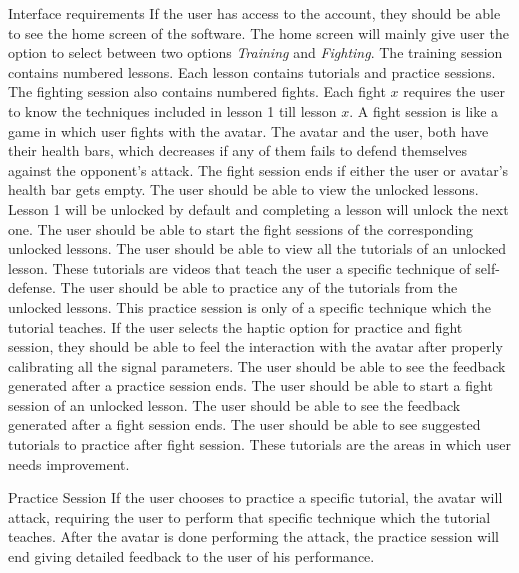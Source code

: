 \begin{outline}
 \1 Interface requirements
  \2 If the user has access to the account, they should be able to see the home screen of the software. The home screen will mainly give user the option to select between two options \textit{Training} and \textit{Fighting}.
  \2 The training session contains numbered lessons. Each lesson contains tutorials and practice sessions. 
  \2 The fighting session also contains numbered fights. Each fight $x$ requires the user to know the techniques included in lesson 1 till lesson $x$. A fight session is like a game in which user fights with the avatar. The avatar and the user, both have their health bars, which decreases if any of them fails to defend themselves against the opponent's attack. The fight session ends if either the user or avatar’s health bar gets empty. 
  \2 The user should be able to view the unlocked lessons. Lesson 1 will be unlocked by default and completing a lesson will unlock the next one. 
  \2 The user should be able to start the fight sessions of the corresponding unlocked lessons. 
  \2 The user should be able to view all the tutorials of an unlocked lesson. These tutorials are videos that teach the user a specific technique of self-defense. 
  \2 The user should be able to practice any of the tutorials from the unlocked lessons. This practice session is only of a specific technique which the tutorial teaches. 
  \2 If the user selects the haptic option for practice and fight session, they should be able to feel the interaction with the avatar after properly calibrating all the signal parameters.
  \2 The user should be able to see the feedback generated after a practice session ends.
  \2 The user should be able to start a fight session of an unlocked lesson.
  \2 The user should be able to see the feedback generated after a fight session ends.
  \2 The user should be able to see suggested tutorials to practice after fight session. These tutorials are the areas in which user needs improvement. 
  
 \1 Practice Session
   \2 If the user chooses to practice a specific tutorial, the avatar will attack, requiring the user to perform that specific technique which the tutorial teaches.  After the avatar is done performing the attack, the practice session will end giving detailed feedback to the user of his performance. 
 

\end{outline}
